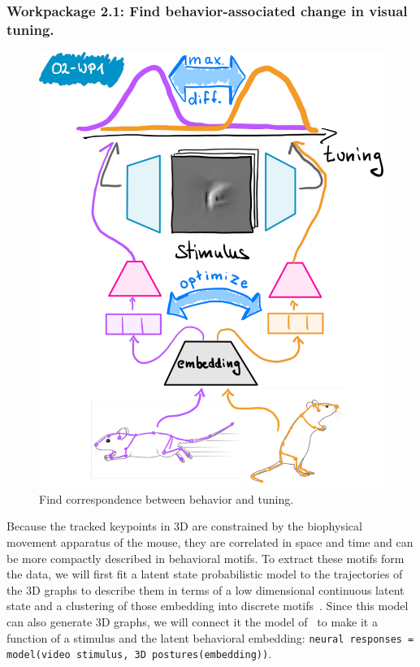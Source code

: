 \documentclass[B2,COG]{ercgrant}
\begin{document}
\subsubsection{Workpackage 2.1: Find behavior-associated change in visual tuning.\hfill {}}
%
\begin{figure}
\includegraphics[width=\linewidth]{figures/o2wp1.pdf}
\caption{Find correspondence between behavior and tuning.\label{fig:o2wp1}}
\end{figure}
%
Because the tracked keypoints in 3D are constrained by the biophysical movement apparatus of the mouse, they are correlated in space and time and can be more compactly described in behavioral motifs. 
To extract these motifs form the data, we will first fit a latent state probabilistic model to the trajectories of the 3D graphs to describe them in terms of a low dimensional continuous latent state and a clustering of those embedding into discrete motifs~\parencite[similar to][]{Wiltschko2015-ey, Wiltschko2020-zd}.
Since this model can also generate 3D graphs, we will connect it the model of~ to make it a function of a stimulus and the latent behavioral embedding: \texttt{neural responses = model(video stimulus, 3D postures(embedding))}.
\end{document}
